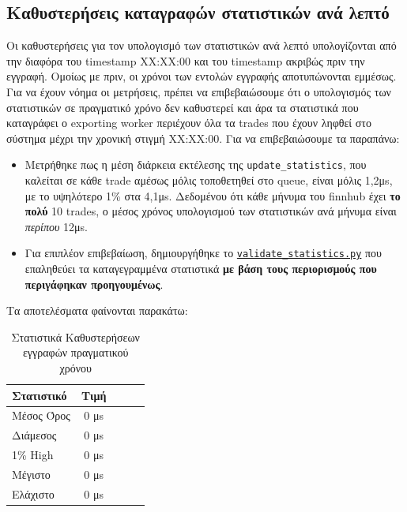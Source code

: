 \documentclass[12pt]{article}
\newcommand{\scripts}[1]{\href{https://github.com/Selivanof/university-collection/tree/main/RealTime_Embedded_Systems/scripts}{\texttt{#1}}}
\begin{document}
\subsection{Καθυστερήσεις καταγραφών στατιστικών ανά λεπτό}
Οι καθυστερήσεις για τον υπολογισμό των στατιστικών ανά λεπτό υπολογίζονται από την διαφόρα του timestamp ΧΧ:ΧΧ:00 και του timestamp ακριβώς πριν την εγγραφή. Ομοίως με πριν, οι χρόνοι των εντολών εγγραφής αποτυπώνονται εμμέσως. Για να έχουν νόημα οι μετρήσεις, πρέπει να επιβεβαιώσουμε ότι ο υπολογισμός των στατιστικών σε πραγματικό χρόνο δεν καθυστερεί και άρα τα στατιστικά που καταγράφει ο exporting worker περιέχουν όλα τα trades που έχουν ληφθεί στο σύστημα μέχρι την χρονική στιγμή XX:XX:00. Για να επιβεβαιώσουμε τα παραπάνω:
\begin{itemize}
    \item Μετρήθηκε πως η μέση διάρκεια εκτέλεσης της \texttt{update\_statistics}, που καλείται σε κάθε trade αμέσως μόλις τοποθετηθεί στο queue, είναι μόλις 1,2μs, με το υψηλότερο 1\% στα 4,1μs. Δεδομένου ότι κάθε μήνυμα του finnhub έχει \textbf{το πολύ} 10 trades, ο μέσος χρόνος υπολογισμού των στατιστικών ανά μήνυμα είναι \textit{περίπου} 12μs.
    \item Για επιπλέον επιβεβαίωση, δημιουργήθηκε το \scripts{validate\_statistics.py} που επαληθεύει τα καταγεγραμμένα στατιστικά \textbf{με βάση τους περιορισμούς που περιγάφηκαν προηγουμένως}.
\end{itemize}
Τα αποτελέσματα φαίνονται παρακάτω:

\begin{table}[H]
    \centering
    \begin{tabular}{lcccc}
        \textbf{Στατιστικό} & \textbf{Τιμή} \\
        \hline
        Μέσος Όρος     & 0 μs \\
        Διάμεσος  & 0 μs \\
        1\% High & 0 μs \\
        Μέγιστο      & 0 μs \\
        Ελάχιστο      & 0 μs \\
    \end{tabular}
    \caption{Στατιστικά Καθυστερήσεων εγγραφών πραγματικού χρόνου}
    \label{tab:stats_summary}
\end{table}
\end{document}
